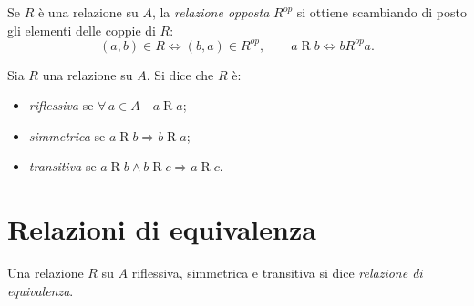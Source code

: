 \documentclass[11pt,a4paper]{article}
\theoremstyle{definition}
\begin{document}
\begin{definizione}
Se $R$ è una relazione su $A$, la \emph{relazione opposta} $R^{op}$ si
ottiene scambiando di posto gli elementi delle coppie di $R$:
\[
(a, b) \in R \iff (b, a) \in R^{op}, \qquad
a \mathrel{R} b \iff b \mathrel{R^{op}} a.
\]
\end{definizione}

\begin{definizione}
Sia $R$ una relazione su $A$. Si dice che $R$ è:
\begin{itemize}
    \item \emph{riflessiva} se $\forall\, a \in A \quad a \mathrel{R} a$;
    \item \emph{simmetrica} se $a \mathrel{R} b \Rightarrow
          b \mathrel{R} a$;
    \item \emph{transitiva} se $a \mathrel{R} b \land b \mathrel{R} c
          \Rightarrow a \mathrel{R} c$.
\end{itemize}
\end{definizione}

\section{Relazioni di equivalenza}

\begin{definizione}
Una relazione $R$ su $A$ riflessiva, simmetrica e transitiva si dice
\emph{relazione di equivalenza}.
\end{definizione}
\end{document}
